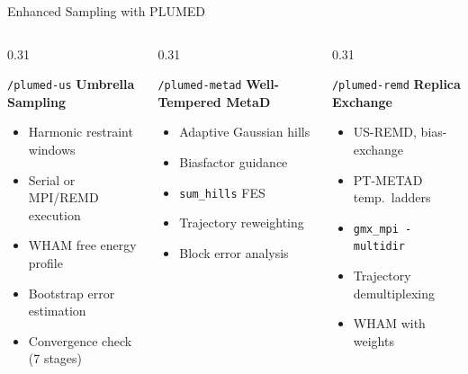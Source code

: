 \documentclass[aspectratio=169, 10pt]{beamer}
\begin{document}
\begin{frame}{Enhanced Sampling with PLUMED}
  \begin{columns}[T]
    \begin{column}{0.31\textwidth}
      \begin{block}{\texttt{/plumed-us}}
        \small
        \textbf{Umbrella Sampling}
        \begin{itemize}\setlength\itemsep{2pt}
          \item Harmonic restraint windows
          \item Serial or MPI/REMD execution
          \item WHAM free energy profile
          \item Bootstrap error estimation
          \item Convergence check (7 stages)
        \end{itemize}
      \end{block}
    \end{column}
    \begin{column}{0.31\textwidth}
      \begin{block}{\texttt{/plumed-metad}}
        \small
        \textbf{Well-Tempered MetaD}
        \begin{itemize}\setlength\itemsep{2pt}
          \item Adaptive Gaussian hills
          \item Biasfactor guidance
          \item \texttt{sum\_hills} FES
          \item Trajectory reweighting
          \item Block error analysis
        \end{itemize}
      \end{block}
    \end{column}
    \begin{column}{0.31\textwidth}
      \begin{block}{\texttt{/plumed-remd}}
        \small
        \textbf{Replica Exchange}
        \begin{itemize}\setlength\itemsep{2pt}
          \item US-REMD, bias-exchange
          \item PT-METAD temp.\ ladders
          \item \texttt{gmx\_mpi -multidir}
          \item Trajectory demultiplexing
          \item WHAM with weights

\end{itemize}
\end{block}
\end{column}
\end{columns}
\end{frame}
\end{document}
